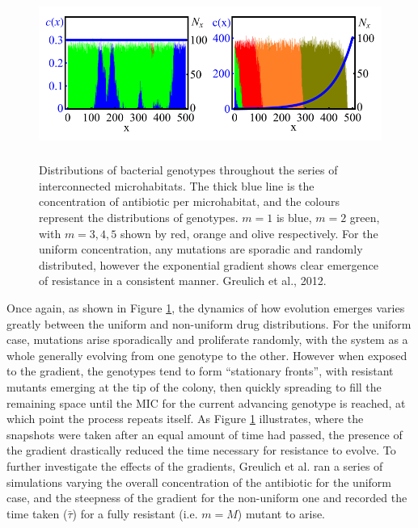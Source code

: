 \documentclass[a4paper,12pt]{article}
\begin{document}
\begin{figure}[H]
 \centering
 \includegraphics[height=5.6cm]{greulich-geno-distbs}
 \caption{Distributions of bacterial genotypes throughout the series of interconnected microhabitats.  The thick blue line is the concentration of antibiotic per 
 microhabitat, and the colours represent the distributions of genotypes.  $m=1$ is blue, $m=2$ green, with $m=3, 4, 5$ shown by red, orange and olive respectively.  
 For the uniform concentration, any mutations are sporadic and randomly  distributed, however the exponential gradient shows clear emergence of resistance in a 
 consistent manner.  Greulich et al., 2012.}
 \label{fig:Greulich-geno-distbs}
\end{figure}

Once again, as shown in Figure \ref{fig:Greulich-geno-distbs}, the dynamics of how evolution emerges varies greatly between the uniform and non-uniform drug distributions.  
For the uniform case, mutations arise sporadically and proliferate randomly, with the system as a whole generally evolving from one genotype to the other.  However when 
exposed to the gradient, the genotypes tend to form ``stationary fronts'', with resistant mutants emerging at the tip of the colony, then quickly spreading to fill
the remaining space until the MIC for the current advancing genotype is reached, at which point the process repeats itself.  As Figure \ref{fig:Greulich-geno-distbs} 
illustrates, where the snapshots were taken after an equal amount of time had passed, the presence of the gradient drastically reduced the time necessary for resistance 
to evolve.  To further investigate the effects of the gradients, Greulich et al. ran a series of simulations varying the overall concentration of the antibiotic for the 
uniform case, and the steepness of the gradient for the non-uniform one and recorded the time taken ($\bar{\tau}$) for a fully resistant (i.e. $m = M$) mutant to arise.
\end{document}
